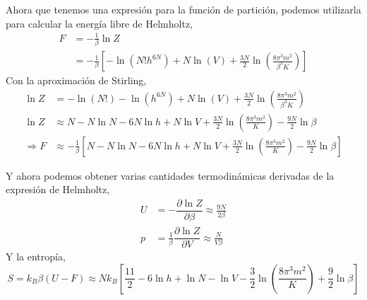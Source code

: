 \documentclass[]{article}
\numberwithin{equation}{section}
\newcommand{\0}{\textcolor{gray}{0}}
\newcommand{\pd}[2]{\dfrac{\partial #1}{\partial #2}}
\begin{document}
Ahora que tenemos una expresión para la función de partición, podemos utilizarla para calcular la energía libre de Helmholtz,
\begin{align*}
	F &= -\frac{1}{\beta} \ln Z \\
	&= -\frac{1}{\beta}\left[-\ln\left(N! h^{6N}\right) + N \ln\left(V\right) + \frac{3N}{2}\ln\left(\frac{8\pi^3 m^2}{\beta^3 K}\right) \right]
\end{align*}
Con la aproximación de Stirling,
\begin{align}
	\ln Z &= -\ln\left(N!\right) - \ln\left(h^{6N}\right) + N \ln\left(V\right) + \frac{3N}{2}\ln\left(\frac{8\pi^3 m^2}{\beta^3 K}\right) \nonumber\\
	\ln Z &\approx N - N\ln N - 6N\ln h + N \ln V + \frac{3N}{2} \ln\left(\frac{8\pi^3 m^2}{K}\right) - \frac{9N}{2} \ln \beta \\
	\Rightarrow F &\approx -\frac{1}{\beta}\left[N - N\ln N - 6N\ln h + N \ln V + \frac{3N}{2}\ln\left(\frac{8\pi^3 m^2}{K}\right) - \frac{9N}{2}\ln \beta \right]
\end{align}

Y ahora podemos obtener varias cantidades termodinámicas derivadas de la expresión de Helmholtz,
\begin{align}
	U &= - \pd{\ln Z}{\beta} \approx \frac{9N}{2\beta}\\
	p &= \frac{1}{\beta} \pd{\ln Z}{V} \approx \frac{N}{V \beta}
\end{align}
Y la entropía,
\begin{equation}
	S = k_B\beta(U - F) \approx N k_B\left[\frac{11}{2} - 6\ln h + \ln N - \ln V - \frac{3}{2}\ln\left(\frac{8\pi^3 m^2}{K}\right) + \frac{9}{2} \ln \beta \right]
\end{equation}
\end{document}
